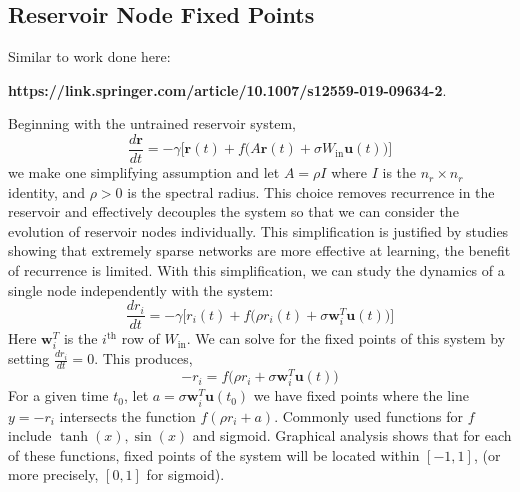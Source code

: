 \documentclass[journal]{journal}
\begin{document}
\subsection{Reservoir Node Fixed Points} Similar to work done here: 

\textbf{https://link.springer.com/article/10.1007/s12559-019-09634-2}. 

Beginning with the untrained reservoir system,
\[
\frac{d\mathbf{r}}{dt} = -\gamma\big[\mathbf{r}(t) + f\big(A\mathbf{r}(t) + \sigma W_\text{in} \mathbf{u}(t)\big)\big]
\]
we make one simplifying assumption and let $A = \rho I$ where $I$ is the $n_r \times n_r$ identity, and $\rho > 0$ is the spectral radius. This choice removes recurrence in the reservoir and effectively decouples the system so that we can consider the evolution of reservoir nodes individually. This simplification is justified by studies showing that extremely sparse networks are more effective at learning, the benefit of recurrence is limited. With this simplification, we can study the dynamics of a single node independently with the system:
\begin{equation}\label{onenode}
\frac{dr_i}{dt} = -\gamma\big[r_i(t) + f\big(\rho r_i(t) + \sigma \mathbf{w}^T_i \mathbf{u}(t)\big)\big]
\end{equation}
Here $\mathbf{w}^T_i$ is the $i^\text{th}$ row of $W_\text{in}$. We can solve for the fixed points of this system by setting $\frac{dr_i}{dt} = 0$. This produces,
\[
-r_i = f\big(\rho r_i + \sigma \mathbf{w}^T_i \mathbf{u}(t)\big)
\]
For a given time $t_0$, let $a = \sigma \mathbf{w}^T_i\mathbf{u}(t_0)$ we have fixed points where the line $y = -r_i$ intersects the function $f(\rho r_i + a)$. Commonly used functions for $f$ include $\tanh(x), \sin(x)$ and sigmoid. Graphical analysis shows that for each of these functions, fixed points of the system will be located within $[-1, 1]$, (or more precisely, $[0, 1]$ for sigmoid).
\end{document}
